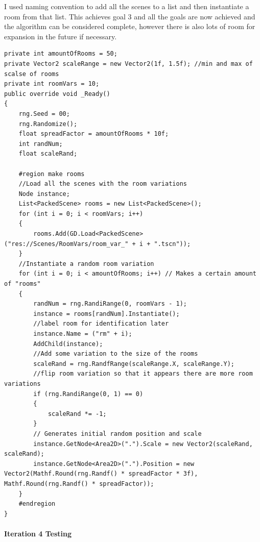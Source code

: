 \documentclass{article}
\newcommand{\parBr}{\vspace{5mm}}%
\newcommand{\myparagraph}[1]{\paragraph{#1}\mbox{}\\} %
\begin{document}
\parBr

I used naming convention to add all the scenes to a list and then instantiate a room from that list. This achieves goal 3 and all the goals are now achieved and the algorithm can be considered complete, however there is also lots of room for expansion in the future if necessary.
\begin{lstlisting}
private int amountOfRooms = 50;
private Vector2 scaleRange = new Vector2(1f, 1.5f); //min and max of scalse of rooms
private int roomVars = 10;
public override void _Ready()
{
    rng.Seed = 00;
    rng.Randomize(); 
    float spreadFactor = amountOfRooms * 10f;
    int randNum;
    float scaleRand;
    
    #region make rooms
    //Load all the scenes with the room variations
    Node instance;
    List<PackedScene> rooms = new List<PackedScene>();
    for (int i = 0; i < roomVars; i++)
    {
        rooms.Add(GD.Load<PackedScene>("res://Scenes/RoomVars/room_var_" + i + ".tscn"));
    }
	//Instantiate a random room variation
    for (int i = 0; i < amountOfRooms; i++) // Makes a certain amount of "rooms"
    {
        randNum = rng.RandiRange(0, roomVars - 1);
        instance = rooms[randNum].Instantiate();
        //label room for identification later
        instance.Name = ("rm" + i);
        AddChild(instance);
		//Add some variation to the size of the rooms
        scaleRand = rng.RandfRange(scaleRange.X, scaleRange.Y);
		//flip room variation so that it appears there are more room variations
        if (rng.RandiRange(0, 1) == 0)
        {
            scaleRand *= -1;
        }
		// Generates initial random position and scale
        instance.GetNode<Area2D>(".").Scale = new Vector2(scaleRand, scaleRand);
        instance.GetNode<Area2D>(".").Position = new Vector2(Mathf.Round(rng.Randf() * spreadFactor * 3f), Mathf.Round(rng.Randf() * spreadFactor)); 
    }
    #endregion
}
\end{lstlisting}

\myparagraph{Iteration 4 Testing}
\end{document}
